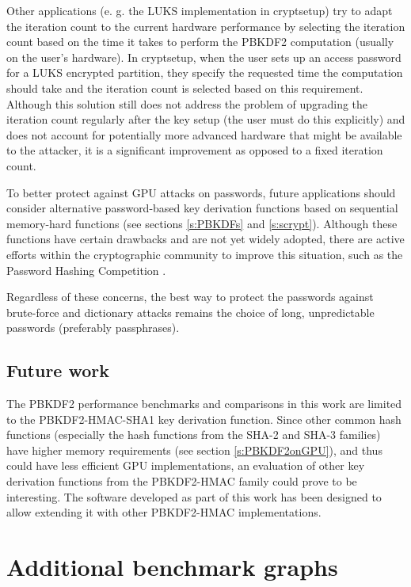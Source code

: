 \documentclass[12pt,oneside]{fithesis2}
\begin{document}
      Other applications (e. g. the LUKS implementation in cryptsetup) try to adapt the iteration count to the current hardware performance by selecting the iteration count based on the time it takes to perform the PBKDF2 computation (usually on the user's hardware). In cryptsetup, when the user sets up an access password for a LUKS encrypted partition, they specify the requested time the computation should take and the iteration count is selected based on this requirement. Although this solution still does not address the problem of upgrading the iteration count regularly after the key setup (the user must do this explicitly) and does not account for potentially more advanced hardware that might be available to the attacker, it is a significant improvement as opposed to a fixed iteration count.
      
      To better protect against GPU attacks on passwords, future applications should consider alternative password-based key derivation functions based on sequential memory-hard functions (see sections \ref{s:PBKDFs} and \ref{s:scrypt}). Although these functions have certain drawbacks and are not yet widely adopted, there are active efforts within the cryptographic community to improve this situation, such as the Password Hashing Competition \cite{phc}.
      
      Regardless of these concerns, the best way to protect the passwords against brute-force and dictionary attacks remains the choice of long, unpredictable passwords (preferably passphrases).
      
      \section{Future work}
      The PBKDF2 performance benchmarks and comparisons in this work are limited to the PBKDF2-HMAC-SHA1 key derivation function. Since other common hash functions (especially the hash functions from the SHA-2 and SHA-3 families) have higher memory requirements (see section \ref{s:PBKDF2onGPU}), and thus could have less efficient GPU implementations, an evaluation of other key derivation functions from the PBKDF2-HMAC family could prove to be interesting. The software developed as part of this work has been designed to allow extending it with other PBKDF2-HMAC implementations.
      
    \appendix
    \chapter{Additional benchmark graphs}        %
    
    
    
    
    
\end{document}
